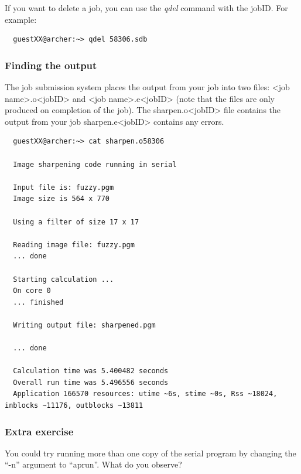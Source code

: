 \documentclass{article}
\begin{document}
If you want to delete a job, you can use the \emph{qdel} command with the
jobID. For example:


\begin{verbatim}
  guestXX@archer:~> qdel 58306.sdb
\end{verbatim}
\subsubsection{Finding the output}
\label{sec-3-5-4}

The job submission system places the output from your job into two
files: <job name>.o<jobID> and <job name>.e<jobID> (note that the
files are only produced on completion of the job). The
sharpen.o<jobID> file contains the output from your job
sharpen.e<jobID> contains any errors.

\begin{verbatim}
  guestXX@archer:~> cat sharpen.o58306

  Image sharpening code running in serial

  Input file is: fuzzy.pgm
  Image size is 564 x 770

  Using a filter of size 17 x 17

  Reading image file: fuzzy.pgm
  ... done

  Starting calculation ...
  On core 0
  ... finished

  Writing output file: sharpened.pgm

  ... done

  Calculation time was 5.400482 seconds
  Overall run time was 5.496556 seconds
  Application 166570 resources: utime ~6s, stime ~0s, Rss ~18024, inblocks ~11176, outblocks ~13811
\end{verbatim}

\subsubsection{Extra exercise}

You could try running more than one copy of the
serial program by changing the ``-n'' argument to ``aprun''. What do you
observe?
\end{document}
